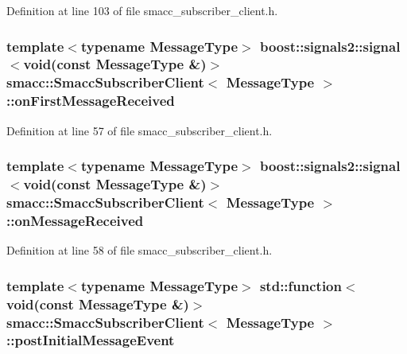 Definition at line 103 of file smacc\+\_\+subscriber\+\_\+client.\+h.

\subsubsection[{\texorpdfstring{on\+First\+Message\+Received}{onFirstMessageReceived}}]{\setlength{\rightskip}{0pt plus 5cm}template$<$typename Message\+Type$>$ boost\+::signals2\+::signal$<$void(const Message\+Type \&)$>$ {\bf smacc\+::\+Smacc\+Subscriber\+Client}$<$ Message\+Type $>$\+::on\+First\+Message\+Received}\hypertarget{classsmacc_1_1SmaccSubscriberClient_a2927ee2e390f12000379c9f48ddb7695}{}\label{classsmacc_1_1SmaccSubscriberClient_a2927ee2e390f12000379c9f48ddb7695}


Definition at line 57 of file smacc\+\_\+subscriber\+\_\+client.\+h.

\subsubsection[{\texorpdfstring{on\+Message\+Received}{onMessageReceived}}]{\setlength{\rightskip}{0pt plus 5cm}template$<$typename Message\+Type$>$ boost\+::signals2\+::signal$<$void(const Message\+Type \&)$>$ {\bf smacc\+::\+Smacc\+Subscriber\+Client}$<$ Message\+Type $>$\+::on\+Message\+Received}\hypertarget{classsmacc_1_1SmaccSubscriberClient_a7635fbb013c6fdbc3998da11b44766bb}{}\label{classsmacc_1_1SmaccSubscriberClient_a7635fbb013c6fdbc3998da11b44766bb}


Definition at line 58 of file smacc\+\_\+subscriber\+\_\+client.\+h.

\subsubsection[{\texorpdfstring{post\+Initial\+Message\+Event}{postInitialMessageEvent}}]{\setlength{\rightskip}{0pt plus 5cm}template$<$typename Message\+Type$>$ std\+::function$<$void(const Message\+Type \&)$>$ {\bf smacc\+::\+Smacc\+Subscriber\+Client}$<$ Message\+Type $>$\+::post\+Initial\+Message\+Event}\hypertarget{classsmacc_1_1SmaccSubscriberClient_aeec34b082c687a24a89942aca44575cc}{}\label{classsmacc_1_1SmaccSubscriberClient_aeec34b082c687a24a89942aca44575cc}


